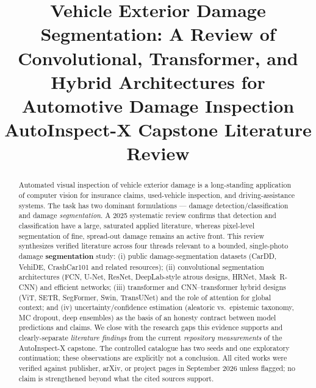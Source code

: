 \documentclass[conference]{IEEEtran}
\begin{document}
\title{Vehicle Exterior Damage Segmentation: A Review of Convolutional,
Transformer, and Hybrid Architectures for Automotive Damage
Inspection\\
{\footnotesize AutoInspect-X Capstone Literature Review}
}

\author{
}

\maketitle

\begin{abstract}
Automated visual inspection of vehicle exterior damage is a long-standing
application of computer vision for insurance claims, used-vehicle inspection,
and driving-assistance systems. The task has two dominant formulations ---
damage detection/classification and damage \emph{segmentation}. A 2025
systematic review confirms that detection and classification have a large,
saturated applied literature, whereas pixel-level segmentation of fine,
spread-out damage remains an active front. This review synthesizes verified
literature across four threads relevant to a bounded, single-photo damage
\textbf{segmentation} study: (i) public damage-segmentation datasets (CarDD,
VehiDE, CrashCar101 and related resources); (ii) convolutional segmentation
architectures (FCN, U-Net, ResNet, DeepLab-style atrous designs, HRNet,
Mask~R-CNN) and efficient networks; (iii) transformer and CNN--transformer
hybrid designs (ViT, SETR, SegFormer, Swin, TransUNet) and the role of
attention for global context; and (iv) uncertainty/confidence estimation
(aleatoric vs.\ epistemic taxonomy, MC dropout, deep ensembles) as the basis of
an honesty contract between model predictions and claims. We close with the
research gaps this evidence supports and clearly-separate \emph{literature
findings} from the current \emph{repository measurements} of the AutoInspect-X
capstone. The controlled catalogue has two seeds and one exploratory
continuation; these observations are explicitly not a conclusion. All cited
works were verified against publisher, arXiv, or project pages in September 2026
unless flagged; no claim is strengthened beyond what the cited sources support.
\end{abstract}
\end{document}
